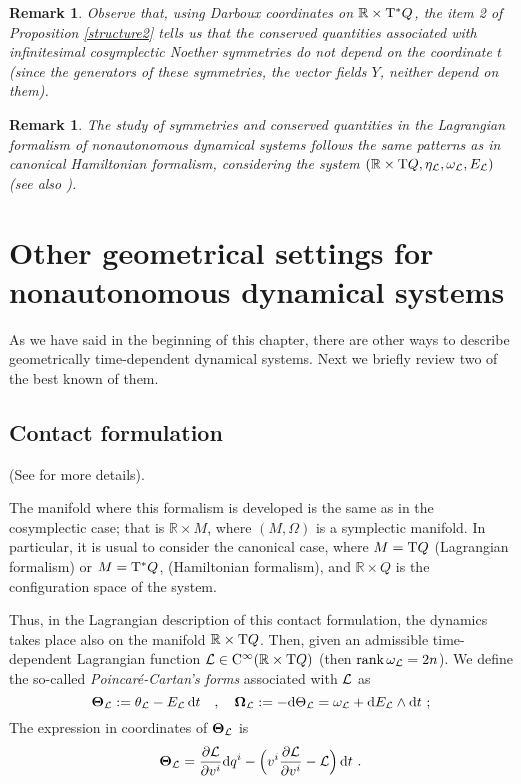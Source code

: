 \documentclass[12pt]{report}
\newtheorem{remark}[teor]{Remark}
\def\derpar#1#2{\frac{\partial{#1}}{\partial{#2}}}
\def\Lag{{\cal L}}
\def\d{{\rm d}}
\def\Real{\mathbb{R}}
\def\Tan{{\rm T}}
\def\Cinfty{{\rm C}^\infty}
\begin{document}
\begin{remark}{\rm 
Observe that, using Darboux coordinates on $\Real\times\Tan^*Q$,
the item 2 of Proposition \ref{structure2} tells us that the conserved quantities
associated with  infinitesimal cosymplectic Noether symmetries
do not depend on the coordinate $t$
(since the generators of these symmetries,
the vector fields $Y$, neither depend on them).
}\end{remark}

\begin{remark}{\rm 
The study of symmetries and conserved quantities in the Lagrangian formalism of nonautonomous dynamical systems
follows the same patterns as in canonical Hamiltonian formalism, considering the system
$(\Real\times\Tan Q,\eta_\Lag,\omega_\Lag,E_\Lag)$ 
(see also \cite{Cr-77,SC-81}).
}\end{remark}


\section{Other geometrical settings for nonautonomous dynamical systems}


As we have said in the beginning of this chapter, there are other ways to describe geometrically
time-dependent dynamical systems.
Next we briefly review two of the best known of them.


\subsection{Contact formulation}


(See \cite{AM-78,CLM-94,CPT-hctd,EMR-gstds,EMR-sdtc,SC-81,SCC-84} for more details).

The manifold where this formalism is developed is the same as in the cosymplectic case;
that is $\Real\times M$, where $(M,\Omega)$ is a symplectic manifold.
In particular, it is usual to consider the canonical case, where
$M=\Tan Q$ (Lagrangian formalism) or $M=\Tan^*Q$, (Hamiltonian formalism),
and $\Real\times Q$ is the configuration space of the system.

Thus, in the Lagrangian description of this contact formulation,
the dynamics takes place also on the manifold $\Real\times\Tan Q$.
Then, given an admissible time-dependent Lagrangian function
${\cal L} \in\Cinfty(\Real\times\Tan Q)$
(then  ${\rm rank}\,\omega_\Lag=2n$).
We define the so-called {\sl Poincar\' e-Cartan's forms} associated with $\Lag$ as
$$
\mbox{\boldmath $\Theta$}_{\cal L}:=\theta_{\cal L}-E_\Lag\,\d t
\quad , \quad
\mbox{\boldmath $\Omega$}_\Lag:=-\d\Theta_{\cal L} = \omega_{\cal L}+\d E_\Lag\wedge\d t \ ;
$$
The expression in coordinates of $\mbox{\boldmath $\Theta$}_{\cal L}$ is
$$
\mbox{\boldmath $\Theta$}_{\cal L}= \derpar{{\cal L}}{v^i}\d q^i -
\Big(v^i \derpar{{\cal L}}{v^i}-{\cal L}\Big)\,\d t \ .
$$
\end{document}

